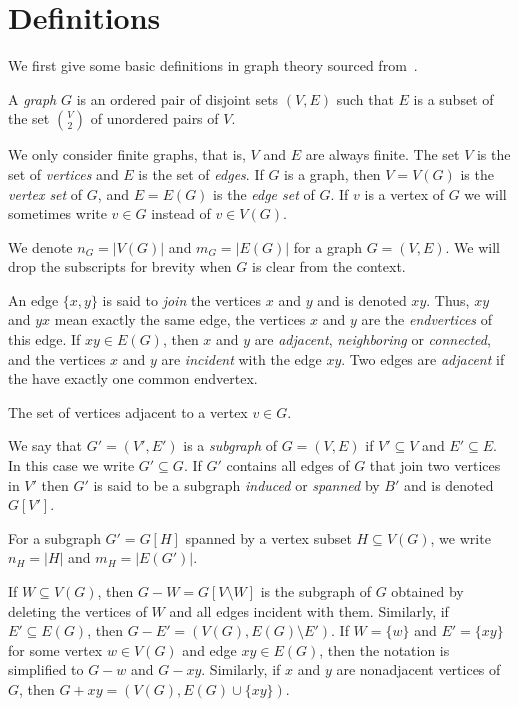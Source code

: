 \section{Definitions}

We first give some basic definitions in graph theory sourced from~\cite{bollobás1998modern}.

\begin{defn}[graph]
    A \emph{graph} $G$ is an ordered pair of disjoint sets $(V, E)$ such that $E$ is a subset of the set $V \choose 2$ of unordered pairs of $V$. 
\end{defn}

We only consider finite graphs, that is, $V$ and $E$ are always finite. The set $V$ is the set of \emph{vertices} and $E$ is the set of \emph{edges}. If $G$ is a graph, then $V = V(G)$ is the \emph{vertex set} of $G$, and $E = E(G)$ is the \emph{edge set} of $G$. If $v$ is a vertex of $G$ we will sometimes write $v \in G$ instead of $v \in V(G)$. 

We denote $n_G = |V(G)|$ and $m_G = |E(G)|$ for a graph $G = (V, E)$. We will drop the subscripts for brevity when $G$ is clear from the context.

An edge $\{ x, y \}$ is said to \emph{join} the vertices $x$ and $y$ and is denoted $xy$. Thus, $xy$ and $yx$ mean exactly the same edge, the vertices $x$ and $y$ are the \emph{endvertices} of this edge. If $xy \in E(G)$, then $x$ and $y$ are \emph{adjacent}, \emph{neighboring} or \emph{connected}, and the  vertices $x$ and $y$ are \emph{incident} with the edge $xy$. Two edges are \emph{adjacent} if the have exactly one common endvertex.

The set of vertices adjacent to a vertex $v \in G$.

\begin{defn}[subgraph]
    We say that $G' = (V', E')$ is a \emph{subgraph} of $G = (V, E)$ if $V' \subseteq V$ and $E' \subseteq E$. In this case we write $G' \subseteq G$. If $G'$ contains all edges of $G$ that join two vertices in $V'$ then $G'$ is said to be a subgraph \emph{induced} or \emph{spanned} by $B'$ and is denoted $G[V']$. 
\end{defn}

For a subgraph $G' = G[H]$ spanned by a vertex subset $H \subseteq V(G)$, we write $n_H = |H|$ and $m_H = |E(G')|$.

If $W \subseteq V(G)$, then $G - W = G[V \setminus W]$ is the subgraph of $G$ obtained by deleting the vertices of $W$ and all edges incident with them. Similarly, if $E' \subseteq E(G)$, then $G - E' = (V(G), E(G) \setminus E')$. If $W = \{ w \}$ and $E' = \{ xy \}$ for some vertex $w \in V(G)$ and edge $xy \in E(G)$, then the notation is simplified to $G - w$ and $G - xy$. Similarly, if $x$ and $y$ are nonadjacent vertices of $G$, then $G + xy = (V(G), E(G) \cup \{ xy \})$.

